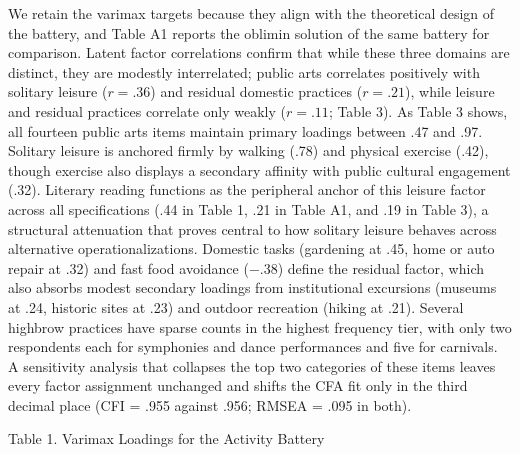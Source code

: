 \documentclass[
  12pt
]{article}
\begin{document}
We retain the varimax targets because they align with the theoretical design of the battery, and Table A1 reports the oblimin solution of the same battery for comparison. Latent factor correlations confirm that while these three domains are distinct, they are modestly interrelated; public arts correlates positively with solitary leisure ($r = .36$) and residual domestic practices ($r = .21$), while leisure and residual practices correlate only weakly ($r = .11$; Table 3). As Table 3 shows, all fourteen public arts items maintain primary loadings between .47 and .97. Solitary leisure is anchored firmly by walking (.78) and physical exercise (.42), though exercise also displays a secondary affinity with public cultural engagement (.32). Literary reading functions as the peripheral anchor of this leisure factor across all specifications (.44 in Table 1, .21 in Table A1, and .19 in Table 3), a structural attenuation that proves central to how solitary leisure behaves across alternative operationalizations. Domestic tasks (gardening at .45, home or auto repair at .32) and fast food avoidance ($-.38$) define the residual factor, which also absorbs modest secondary loadings from institutional excursions (museums at .24, historic sites at .23) and outdoor recreation (hiking at .21). Several highbrow practices have sparse counts in the highest frequency tier, with only two respondents each for symphonies and dance performances and five for carnivals. A sensitivity analysis that collapses the top two categories of these items leaves every factor assignment unchanged and shifts the CFA fit only in the third decimal place (CFI = .955 against .956; RMSEA = .095 in both).


Table 1. Varimax Loadings for the Activity Battery
\end{document}
